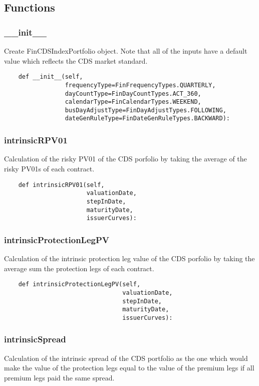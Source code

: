 \documentclass[twoside,11pt]{book}
\begin{document}
\subsection*{Functions}

\subsubsection*{{\bf \_\_init\_\_}}
Create FinCDSIndexPortfolio object. Note that all of the inputs have a default value which reflects the CDS market standard.  

\begin{lstlisting}
    def __init__(self,
                 frequencyType=FinFrequencyTypes.QUARTERLY,
                 dayCountType=FinDayCountTypes.ACT_360,
                 calendarType=FinCalendarTypes.WEEKEND,
                 busDayAdjustType=FinDayAdjustTypes.FOLLOWING,
                 dateGenRuleType=FinDateGenRuleTypes.BACKWARD):
\end{lstlisting}

\subsubsection*{{\bf intrinsicRPV01}}
Calculation of the risky PV01 of the CDS porfolio by taking the average of the risky PV01s of each contract.  

\begin{lstlisting}
    def intrinsicRPV01(self,
                       valuationDate,
                       stepInDate,
                       maturityDate,
                       issuerCurves):
\end{lstlisting}

\subsubsection*{{\bf intrinsicProtectionLegPV}}
Calculation of the intrinsic protection leg value of the CDS porfolio by taking the average sum the protection legs of each contract.  

\begin{lstlisting}
    def intrinsicProtectionLegPV(self,
                                 valuationDate,
                                 stepInDate,
                                 maturityDate,
                                 issuerCurves):
\end{lstlisting}

\subsubsection*{{\bf intrinsicSpread}}
Calculation of the intrinsic spread of the CDS portfolio as the one which would make the value of the protection legs equal to the value of the premium legs if all premium legs paid the same spread.  
\end{document}
